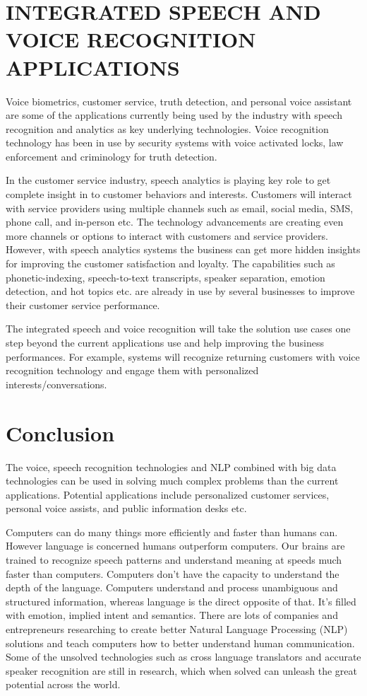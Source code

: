 \documentclass[sigconf]{acmart}
\begin{document}
\section{INTEGRATED SPEECH AND VOICE RECOGNITION APPLICATIONS}
Voice biometrics, customer service, truth detection, and personal voice assistant are some of the applications currently being used by the industry with speech recognition and analytics as key underlying technologies. Voice recognition technology has been in use by security systems with voice activated locks, law enforcement and criminology for truth detection. 

In the customer service industry, speech analytics is playing key role to get complete insight in to customer behaviors and interests. Customers will interact with service providers using multiple channels such as email, social media, SMS, phone call, and in-person etc. The technology advancements are creating even more channels or options to interact with customers and service providers.  However, with speech analytics systems the business can get more hidden insights for improving the customer satisfaction and loyalty. The capabilities such as phonetic-indexing, speech-to-text transcripts, speaker separation, emotion detection, and hot topics etc. are already in use by several businesses to improve their customer service performance.

The integrated speech and voice recognition will take the solution use cases one step beyond the current applications use and help improving the business performances. For example, systems will recognize returning customers with voice recognition technology and engage them with personalized interests/conversations. 

\section{Conclusion}
 The voice, speech recognition technologies and NLP combined with big data technologies can be used in solving much complex problems than the current applications. Potential applications include personalized customer services, personal voice assists, and public information desks etc. 
 
 Computers can do many things more efficiently and faster than humans can. However language is concerned humans outperform computers. Our brains are trained to recognize speech patterns and understand meaning at speeds much faster than computers. Computers don't have the capacity to understand the depth of the language. Computers understand and process unambiguous and structured information, whereas language is the direct opposite of that. It's filled with emotion, implied intent and semantics. There are lots of companies and entrepreneurs researching to create better Natural Language Processing (NLP) solutions and teach computers how to better understand human communication. Some of the unsolved technologies such as cross language translators and accurate speaker recognition are still in research, which when solved can unleash the great potential across the world.
\end{document}
